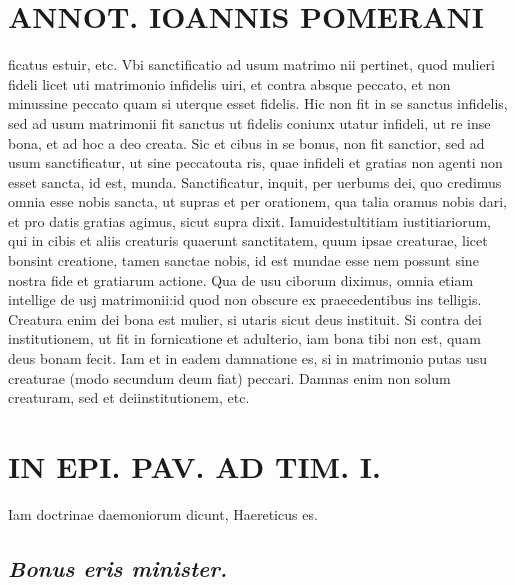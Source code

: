 \documentclass{article}
\begin{document}
\begin{pages}
\section*{ANNOT. IOANNIS POMERANI }\pstart ficatus estuir, etc. Vbi sanctificatio ad usum matrimo nii pertinet, quod mulieri fideli licet uti matrimonio infidelis uiri, et contra absque peccato, et non minussine peccato quam si uterque esset fidelis. Hic non fit in se sanctus infidelis, sed ad usum matrimonii fit sanctus ut fidelis coniunx utatur infideli, ut re inse bona, et ad hoc a deo creata. Sic et cibus in se bonus, non fit sanctior, sed ad usum sanctificatur, ut sine peccatouta ris, quae infideli et gratias non agenti non esset sancta, id est, munda. Sanctificatur, inquit, per uerbums dei, quo credimus omnia esse nobis sancta, ut supras et per orationem, qua talia oramus nobis dari, et pro datis gratias agimus, sicut supra dixit. Iamuidestultitiam iustitiariorum, qui in cibis et aliis creaturis quaerunt sanctitatem, quum ipsae creaturae, licet bonsint creatione, tamen sanctae nobis, id est mundae esse nem possunt sine nostra fide et gratiarum actione. Qua de usu ciborum diximus, omnia etiam intellige de usj matrimonii:id quod non obscure ex praecedentibus ins telligis. Creatura enim dei bona est mulier, si utaris sicut deus instituit. Si contra dei institutionem, ut fit in fornicatione et adulterio, iam bona tibi non est, quam deus bonam fecit. Iam et in eadem damnatione es, si in matrimonio putas usu creaturae (modo secundum deum fiat) peccari. Damnas enim non solum creaturam, sed et deiinstitutionem, etc.  \pend
\section*{IN EPI. PAV. AD TIM. I. }
\marginpar{[ p.91 ]}\pstart Iam doctrinae daemoniorum dicunt, Haereticus es.  \pend
{}
{}
\subsection*{\textit{Bonus eris minister. }}
{}

\end{pages}
\end{document}

